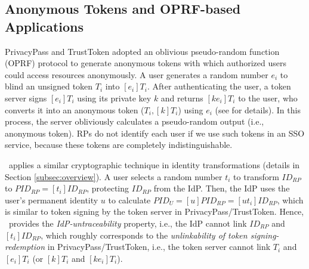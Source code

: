 \subsection{Anonymous Tokens and OPRF-based Applications}
\label{sec:related}

PrivacyPass and TrustToken \cite{privacypass,trusttoken} adopted an oblivious pseudo-random function (OPRF) protocol \cite{oprf-proved,voprf-proved} to generate anonymous tokens with which authorized users could access resources anonymously.
A user generates a random number $e_i$ to blind an unsigned token $T_i$ into $[e_i]T_i$. After authenticating the user, a token server signs $[e_i]T_i$ using its private key $k$ and returns $[k e_i]T_i$ to the user, who converts it into an anonymous token  ($T_i, [k]T_i$) using $e_i$ (see \cite{privacypass,trusttoken,oprf-proved} for details). In this process, the server obliviously calculates a pseudo-random output (i.e., anonymous token).
RPs do not identify each user if we use such tokens in an SSO service, because these tokens are completely indistinguishable.

\usso\ applies a similar cryptographic technique in identity transformations  (details in Section \ref{subsec:overview}).
 A user selects a random number $t_i$ to transform $ID_{RP}$ to $PID_{RP} = [t_i]ID_{RP}$, protecting $ID_{RP}$ from the IdP.
Then, the IdP uses the user's permanent identity $u$ to calculate $PID_U = [u]PID_{RP} = [ut_i]ID_{RP}$,
which is similar to token signing by the token server in PrivacyPass/TrustToken. Hence, \usso\ provides the \emph{IdP-untraceability} property, i.e., the IdP cannot link $ID_{RP}$ and $[t_i]ID_{RP}$, which roughly corresponds to the {\em unlinkability of token signing-redemption} in PrivacyPass/TrustToken, i.e., the token server cannot link $T_i$ and $[e_i]T_i$ (or $[k]T_i$ and $[ke_i]T_i$). %


